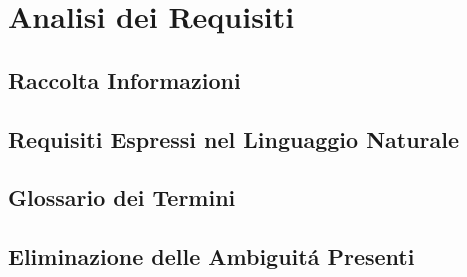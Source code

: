 \documentclass[12pt]{article} %
\begin{document}








\tableofcontents

\newpage


	\section{Analisi dei Requisiti}

	


		\subsection{Raccolta Informazioni} %

		
		\subsection{Requisiti Espressi nel Linguaggio Naturale}

		

		\subsection{Glossario dei Termini}

		
		\newpage
		\subsection{Eliminazione delle Ambiguit\'{a} Presenti}
\end{document}
